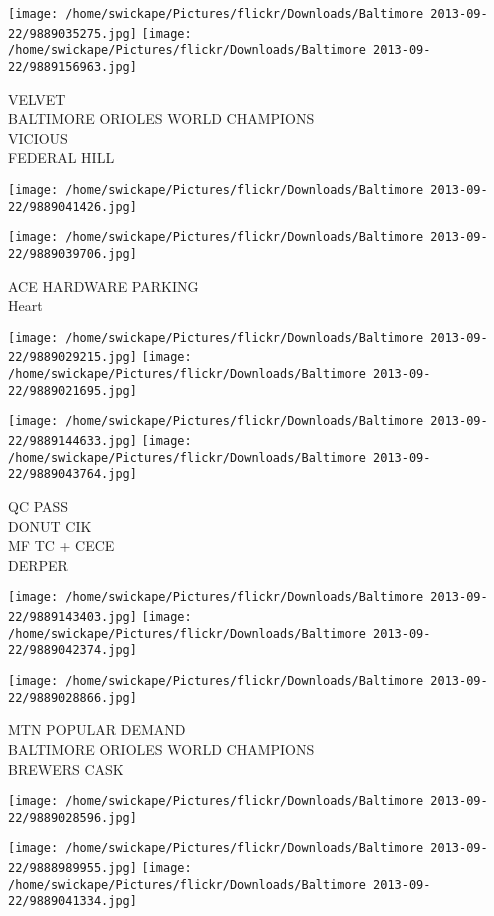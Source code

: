 \documentclass[10pt,letterpaper]{article}
\begin{document}
\texttt{[image: /home/swickape/Pictures/flickr/Downloads/Baltimore 2013-09-22/9889035275.jpg]}
\texttt{[image: /home/swickape/Pictures/flickr/Downloads/Baltimore 2013-09-22/9889156963.jpg]}

VELVET\\
BALTIMORE ORIOLES WORLD CHAMPIONS\\
VICIOUS\\
FEDERAL HILL
\pagebreak

\texttt{[image: /home/swickape/Pictures/flickr/Downloads/Baltimore 2013-09-22/9889041426.jpg]}

\vspace{0.25in}
\texttt{[image: /home/swickape/Pictures/flickr/Downloads/Baltimore 2013-09-22/9889039706.jpg]}

ACE HARDWARE PARKING\\
Heart
\pagebreak

\texttt{[image: /home/swickape/Pictures/flickr/Downloads/Baltimore 2013-09-22/9889029215.jpg]}
\texttt{[image: /home/swickape/Pictures/flickr/Downloads/Baltimore 2013-09-22/9889021695.jpg]}

\texttt{[image: /home/swickape/Pictures/flickr/Downloads/Baltimore 2013-09-22/9889144633.jpg]}
\texttt{[image: /home/swickape/Pictures/flickr/Downloads/Baltimore 2013-09-22/9889043764.jpg]}

QC PASS\\
DONUT CIK\\
MF TC + CECE\\
DERPER
\pagebreak

\texttt{[image: /home/swickape/Pictures/flickr/Downloads/Baltimore 2013-09-22/9889143403.jpg]}
\texttt{[image: /home/swickape/Pictures/flickr/Downloads/Baltimore 2013-09-22/9889042374.jpg]}

\texttt{[image: /home/swickape/Pictures/flickr/Downloads/Baltimore 2013-09-22/9889028866.jpg]}

MTN POPULAR DEMAND\\
BALTIMORE ORIOLES WORLD CHAMPIONS\\
BREWERS CASK
\pagebreak

\texttt{[image: /home/swickape/Pictures/flickr/Downloads/Baltimore 2013-09-22/9889028596.jpg]}

\vspace{0.25in}
\texttt{[image: /home/swickape/Pictures/flickr/Downloads/Baltimore 2013-09-22/9888989955.jpg]}
\texttt{[image: /home/swickape/Pictures/flickr/Downloads/Baltimore 2013-09-22/9889041334.jpg]}
\end{document}
